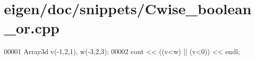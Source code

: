 \hypertarget{eigen_2doc_2snippets_2_cwise__boolean__or_8cpp_source}{}\section{eigen/doc/snippets/\+Cwise\+\_\+boolean\+\_\+or.cpp}
\label{eigen_2doc_2snippets_2_cwise__boolean__or_8cpp_source}

\begin{DoxyCode}
00001 Array3d v(-1,2,1), w(-3,2,3);
00002 cout << ((v<w) || (v<0)) << endl;
\end{DoxyCode}
